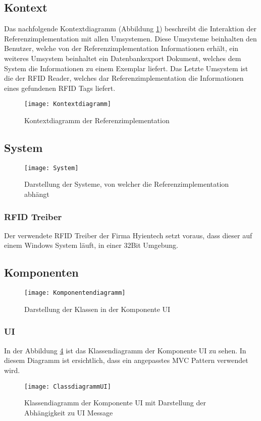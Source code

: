 \subsection{Kontext}

Das nachfolgende Kontextdiagramm (Abbildung \ref{fig:Kontextdiagramm}) beschreibt die Interaktion der Referenzimplementation mit allen Umsystemen. Diese Umsysteme beinhalten den Benutzer, welche von der Referenzimplementation Informationen erhält, ein weiteres Umsystem beinhaltet ein Datenbankexport Dokument, welches dem System die Informationen zu einem Exemplar liefert. Das Letzte Umsystem ist die der RFID Reader, welches dar Referenzimplementation die Informationen eines gefundenen RFID Tags liefert.
\begin{figure}[htb]
	\centering
	\texttt{[image: Kontextdiagramm]}
	\caption{Kontextdiagramm der Referenzimplementation}
	\label{fig:Kontextdiagramm}
\end{figure}

\subsection{System}
\begin{figure}[htb]
	\centering
	\texttt{[image: System]}
	\caption{Darstellung der Systeme, von welcher die Referenzimplementation abhängt}
	\label{fig:System}
\end{figure}
\subsubsection{RFID Treiber}
Der verwendete RFID Treiber der Firma Hyientech setzt voraus, dass dieser auf einem Windows System läuft, in einer 32Bit Umgebung.

\subsection{Komponenten}
\begin{figure}[htb]
	\centering
	\texttt{[image: Komponentendiagramm]}
	\caption{Darstellung der Klassen in der Komponente UI}
	\label{fig:Components}
\end{figure}

\clearpage
\subsubsection{UI}
In der Abbildung \ref{fig:ClassUI} ist das Klassendiagramm der Komponente UI zu sehen.
In diesem Diagramm ist ersichtlich, dass ein angepasstes MVC Pattern verwendet wird.
\begin{figure}[htb]
	\centering
	\texttt{[image: ClassdiagrammUI]}
	\caption{Klassendiagramm der Komponente UI mit Darstellung der Abhängigkeit zu UI Message}
	\label{fig:ClassUI}
\end{figure}
